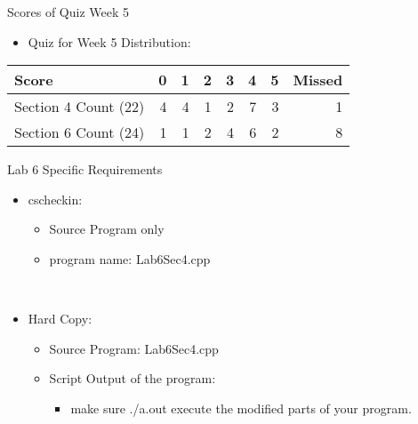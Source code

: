 \documentclass[presentation]{beamer}
\begin{document}
\begin{frame}[label=sec-4]{Scores of Quiz Week 5}
\\
\begin{itemize}
\item \alert{Quiz for Week 5} Distribution:
\end{itemize}
\begin{center}
\begin{tabular}{lrrrrrrr}
\hline
Score & 0 & 1 & 2 & 3 & 4 & 5 & Missed\\
\hline
Section \alert{4} Count (22) & 4 & 4 & 1 & 2 & 7 & 3 & 1\\
\hline
Section \alert{6} Count (24) & 1 & 1 & 2 & 4 & 6 & 2 & 8\\
\hline
\end{tabular}
\end{center}
\end{frame}

\begin{frame}[label=sec-5]{Lab 6 Specific Requirements}
\begin{itemize}
\item \alert{cscheckin}:
\begin{itemize}
\item \alert{Source Program} only
\item program name: \alert{Lab6Sec4.cpp}
\end{itemize}
\end{itemize}
\\
\begin{itemize}
\item \alert{Hard Copy}:
\begin{itemize}
\item \alert{Source Program}: Lab6Sec4.cpp
\item \alert{Script Output} of the program: 
\begin{itemize}
\item make sure \alert{./a.out} execute the modified parts of your program.
\end{itemize}
\end{itemize}
\end{itemize}
\end{frame}
\end{document}
